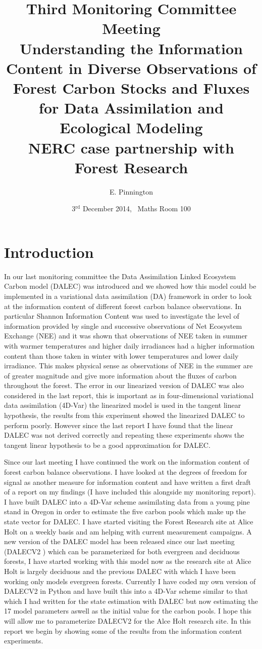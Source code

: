 \documentclass[11pt]{article}
\title{Third Monitoring Committee Meeting\\\vspace{4mm} \normalsize{Understanding the Information Content in Diverse Observations of Forest Carbon Stocks and Fluxes for Data Assimilation and Ecological Modeling\\ NERC case partnership with Forest Research}}
\date{\normalsize{3$^{\text{rd}}$ December 2014, \ Maths Room 100}}
\author{\normalsize{E. Pinnington}}
\begin{document}
\maketitle

\section{Introduction}

In our last monitoring committee the Data Assimilation Linked Ecosystem Carbon model (DALEC) \cite{williams2005improved} was introduced and we showed how this model could be implemented in a variational data assimilation (DA) framework in order to look at the information content of different forest carbon balance observations. In particular Shannon Information Content \cite{rodgers2000inverse} was used to investigate the level of information provided by single and successive observations of Net Ecosystem Exchange (NEE) and it was shown that observations of NEE taken in summer with warmer temperatures and higher daily irradiances had a higher information content than those taken in winter with lower temperatures and lower daily irradiance. This makes physical sense as observations of NEE in the summer are of greater magnitude and give more information about the fluxes of carbon throughout the forest. The error in our linearized version of DALEC was also considered in the last report, this is important as in four-dimensional variational data assimilation (4D-Var) the linearized model is used in the tangent linear hypothesis, the results from this experiment showed the linearized DALEC to perform poorly. However since the last report I have found that the linear DALEC was not derived correctly and repeating these experiments shows the tangent linear hypothesis to be a good approximation for DALEC. 

Since our last meeting I have continued the work on the information content of forest carbon balance observations. I have looked at the degrees of freedom for signal as another measure for information content and have written a first draft of a report on my findings (I have included this alongside my monitoring report). I have built DALEC into a 4D-Var scheme assimilating data from a young pine stand in Oregon in order to estimate the five carbon pools which make up the state vector for DALEC. I have started visiting the Forest Research site at Alice Holt on a weekly basis and am helping with current measurement campaigns. A new version of the DALEC model has been released since our last meeting (DALECV2 \cite{Bloom2014}) which can be parameterized for both evergreen and deciduous forests, I have started working with this model now as the research site at Alice Holt is largely deciduous and the previous DALEC with which I have been working only models evergreen forests. Currently I have coded my own version of DALECV2 in Python and have built this into a 4D-Var scheme similar to that which I had written for the state estimation with DALEC but now estimating the 17 model parameters aswell as the initial value for the carbon pools. I hope this will allow me to parameterize DALECV2 for the Alce Holt research site. In this report we begin by showing some of the results from the information content experiments.
\end{document}

